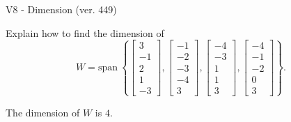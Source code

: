 \begin{exercise}
  \begin{exerciseTitle}V8 - Dimension (ver. 449)\end{exerciseTitle}
  \begin{exerciseStatement}
    Explain how to find the dimension of 
\[W=\mathrm{span}\ \left\{\left[\begin{array}{r}
3 \\
-1 \\
2 \\
1 \\
-3
\end{array}\right] , \left[\begin{array}{r}
-1 \\
-2 \\
-3 \\
-4 \\
3
\end{array}\right] , \left[\begin{array}{r}
-4 \\
-3 \\
1 \\
1 \\
3
\end{array}\right] , \left[\begin{array}{r}
-4 \\
-1 \\
-2 \\
0 \\
3
\end{array}\right]\right\}.\]



  \end{exerciseStatement}
  \begin{exerciseAnswer}
   The dimension of \(W\) is  \(4\).
  


  \end{exerciseAnswer}
\end{exercise}